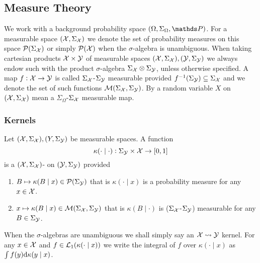 \documentclass{article}
\begin{document}
\subsection{Measure Theory}

We work with a background probability space $(\Omega, \Sigma_\Omega, \Prob)$.
For a measurable space $(\mathcal{X}, \Sigma_{\mathcal{X}})$ we denote
the set of probability measures on this space $\mathcal{P}(\Sigma_\mathcal{X})$ or
simply $\mathcal{P}(\mathcal{X})$ when the $\sigma$-algebra is unambiguous.
When taking cartesian products $\mathcal{X} \times \mathcal{Y}$ of measurable spaces
$(\mathcal{X}, \Sigma_\mathcal{X}), (\mathcal{Y}, \Sigma_\mathcal{Y})$ we always endow such
with the product $\sigma$-algebra $\Sigma_\mathcal{X} \otimes \Sigma_\mathcal{Y}$,
unless otherwise specified.
A map $f: \mathcal{X} \to \mathcal{Y}$ is called $\Sigma_{\mathcal{X}}$-$\Sigma_{\mathcal{Y}}$
measurable provided $f^{-1}(\Sigma_{\mathcal{Y}}) \subseteq \Sigma_{\mathcal{X}}$
and we denote the set of such functions $\mathcal{M}(\Sigma_{\mathcal{X}},
\Sigma_{\mathcal{Y}})$.
By a random variable $X$ on $(\mathcal{X}, \Sigma_{\mathcal{X}})$ mean a
$\Sigma_\Omega$-$\Sigma_{\mathcal{X}}$ measurable map.

\subsubsection{Kernels}

\begin{defn}
  Let $(\mathcal{X}, \Sigma_\mathcal{X}), (Y, \Sigma_\mathcal{Y})$ be measurable spaces.
  A function
  \[ \kappa(\cdot \mid \cdot) : \Sigma_\mathcal{Y} \times \mathcal{X} \to [0,1] \]
  is a $(\mathcal{X}, \Sigma_\mathcal{X})$-
  on $(\mathcal{Y}, \Sigma_\mathcal{Y})$ provided
  \begin{enumerate}
    \item $B \mapsto \kappa(B \mid x) \in \mathcal{P}(\Sigma_\mathcal{Y})$
      that is $\kappa(\cdot \mid x)$ is a probability measure
      for any $x \in \mathcal{X}$.
    \item
      $x \mapsto \kappa(B \mid x) \in \mathcal{M}(\Sigma_\mathcal{X}, \Sigma_\mathcal{Y})$
      that is $\kappa(B \mid \cdot)$ is ($\Sigma_\mathcal{X}$-$\Sigma_\mathcal{Y}$)
      measurable for any $B \in \Sigma_\mathcal{Y}$.
  \end{enumerate}
  When the $\sigma$-algebras are unambiguous we shall simply say an
  $\mathcal{X} \leadsto \mathcal{Y}$ kernel.
  For any $x \in \mathcal{X}$ and $f \in \mathcal{L}_1(\kappa(\cdot \mid x))$
  we write the integral of $f$ over $\kappa(\cdot \mid x)$ as
  $\int f(y) \mathrm{d} \kappa(y \mid x)$.
  \label{defn:probKer}
\end{defn}
\end{document}
